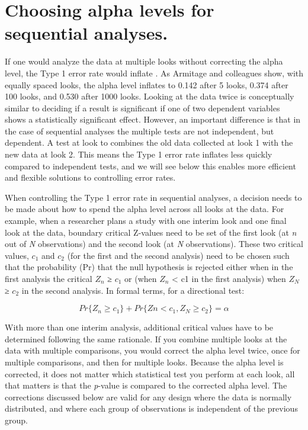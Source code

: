 \documentclass[
  oneside]{book}
\begin{document}
\hypertarget{choosing-alpha-levels-for-sequential-analyses.}{%
\section{Choosing alpha levels for sequential analyses.}\label{choosing-alpha-levels-for-sequential-analyses.}}

If one would analyze the data at multiple looks without correcting the alpha level, the Type 1 error rate would inflate \citep{armitage_repeated_1969}. As Armitage and colleagues show, with equally spaced looks, the alpha level inflates to 0.142 after 5 looks, 0.374 after 100 looks, and 0.530 after 1000 looks. Looking at the data twice is conceptually similar to deciding if a result is significant if one of two dependent variables shows a statistically significant effect. However, an important difference is that in the case of sequential analyses the multiple tests are not independent, but dependent. A test at look to combines the old data collected at look 1 with the new data at look 2. This means the Type 1 error rate inflates less quickly compared to independent tests, and we will see below this enables more efficient and flexible solutions to controlling error rates.

When controlling the Type 1 error rate in sequential analyses, a decision needs to be made about how to spend the alpha level across all looks at the data. For example, when a researcher plans a study with one interim look and one final look at the data, boundary critical Z-values need to be set of the first look (at \emph{n} out of \emph{N} observations) and the second look (at \emph{N} observations). These two critical values, \(c_1\) and \(c_2\) (for the first and the second analysis) need to be chosen such that the probability (Pr) that the null hypothesis is rejected either when in the first analysis the critical \(Z_n\) ≥ \(c_1\) or (when \(Z_n\) \textless{} c1 in the first analysis) when \(Z_N\) ≥ \(c_2\) in the second analysis. In formal terms, for a directional test:

\[Pr\{Z_n \geq c_1\} + Pr\{Zn < c_1, Z_N \geq c_2\} = \alpha\]

With more than one interim analysis, additional critical values have to be determined following the same rationale. If you combine multiple looks at the data with multiple comparisons, you would correct the alpha level twice, once for multiple comparisons, and then for multiple looks. Because the alpha level is corrected, it does not matter which statistical test you perform at each look, all that matters is that the \emph{p}-value is compared to the corrected alpha level. The corrections discussed below are valid for any design where the data is normally distributed, and where each group of observations is independent of the previous group.
\end{document}
